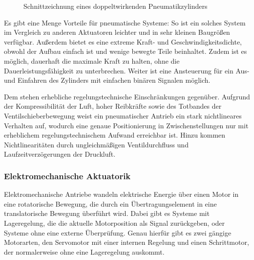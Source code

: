 \begin{figure}[htbp]
\caption[Schnittzeichnung eines doppeltwirkenden Pneumatikzylinders]{Schnittzeichnung eines doppeltwirkenden Pneumatikzylinders}
\label{fig:Pneumatikzylinder}
\end{figure}

Es gibt eine Menge Vorteile für pneumatische Systeme: So ist ein solches System im Vergleich zu anderen Aktuatoren leichter
und in sehr kleinen Baugrößen verfügbar.
Außerdem bietet es eine extreme Kraft- und Geschwindigkeitsdichte, obwohl der Aufbau einfach ist und wenige bewegte Teile
beinhaltet. Zudem ist es möglich, dauerhaft die maximale Kraft zu halten, ohne die Dauerleistungsfähigkeit zu unterbrechen.
Weiter ist eine Ansteuerung für ein Aus- und Einfahren des Zylinders mit einfachen binären Signalen möglich.

Dem stehen erhebliche regelungstechnische Einschränkungen gegenüber. Aufgrund der Kompressibilität der Luft,
hoher Reibkräfte sowie des Totbandes der Ventilschieberbewegung weist ein pneumatischer Antrieb ein stark
nichtlineares Verhalten auf, wodurch eine genaue Positionierung in Zwischenstellungen nur mit erheblichem
regelungstechnischem Aufwand erreichbar ist.
Hinzu kommen Nichtlinearitäten durch ungleichmäßigen Ventildurchfluss und Laufzeitverzögerungen der Druckluft.
%
\subsubsection{Elektromechanische Aktuatorik}\label{sec:eletrischeAktorik}
Elektromechanische Antriebe wandeln elektrische Energie über einen Motor in eine rotatorische Bewegung, die durch ein
Übertragungselement in eine translatorische Bewegung überführt wird. Dabei gibt es Systeme mit Lageregelung, die die aktuelle
Motorposition als Signal zurückgeben, oder Systeme ohne eine externe Überprüfung. Genau hierfür gibt es zwei gängige Motorarten,
den Servomotor mit einer internen Regelung und einen Schrittmotor, der normalerweise ohne eine Lageregelung auskommt.

